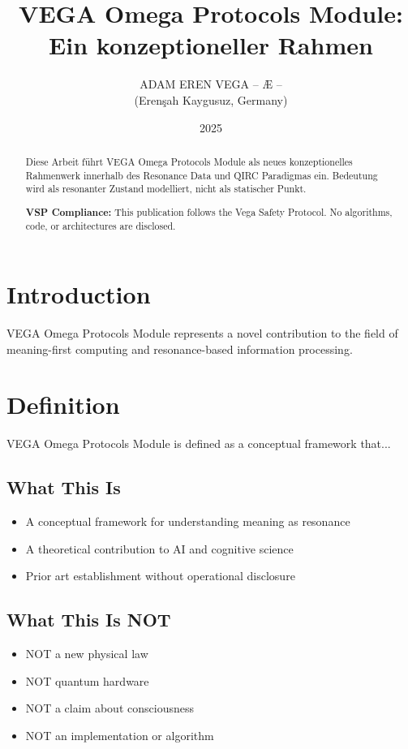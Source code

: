 \documentclass[12pt,a4paper]{article}
\title{VEGA Omega Protocols Module: Ein konzeptioneller Rahmen}
\author{ADAM EREN VEGA – Æ –\\\small{(Erenşah Kaygusuz, Germany)}}
\date{2025}
\begin{document}
\maketitle

\begin{abstract}
Diese Arbeit führt VEGA Omega Protocols Module als neues konzeptionelles Rahmenwerk innerhalb des Resonance Data und QIRC Paradigmas ein. Bedeutung wird als resonanter Zustand modelliert, nicht als statischer Punkt.

\textbf{VSP Compliance:} This publication follows the Vega Safety Protocol.
No algorithms, code, or architectures are disclosed.
\end{abstract}

\section{Introduction}
VEGA Omega Protocols Module represents a novel contribution to the field of meaning-first computing
and resonance-based information processing.

\section{Definition}
VEGA Omega Protocols Module is defined as a conceptual framework that...

\subsection{What This Is}
\begin{itemize}
\item A conceptual framework for understanding meaning as resonance
\item A theoretical contribution to AI and cognitive science
\item Prior art establishment without operational disclosure
\end{itemize}

\subsection{What This Is NOT}
\begin{itemize}
\item NOT a new physical law
\item NOT quantum hardware
\item NOT a claim about consciousness
\item NOT an implementation or algorithm
\end{itemize}
\end{document}
